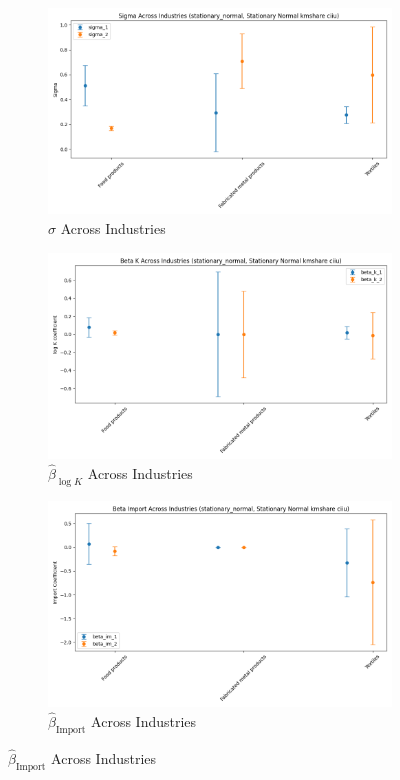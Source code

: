 \documentclass{article}
\begin{document}
\begin{figure}[ht!]
    \begin{subfigure}[t]{0.32\textwidth}
        \centering
        \includegraphics[width=\textwidth]{figure/stationary_normal_kmshare_ciiu_sigma_across_industries.png}
        \caption{$\hat\sigma$ Across Industries}
    \end{subfigure}
    \begin{subfigure}[t]{0.32\textwidth}
        \centering
        \includegraphics[width=\textwidth]{figure/stationary_normal_kmshare_ciiu_beta_k_across_industries.png}
        \caption{$\hat{\beta}_{\log K}$ Across Industries}
    \end{subfigure}
    \begin{subfigure}[t]{0.32\textwidth}
        \centering
        \includegraphics[width=\textwidth]{figure/stationary_normal_kmshare_ciiu_beta_im_across_industries.png}
        \caption{$\hat{\beta}_{\text{Import}}$ Across Industries}
    \end{subfigure}
\end{figure}
\end{document}
